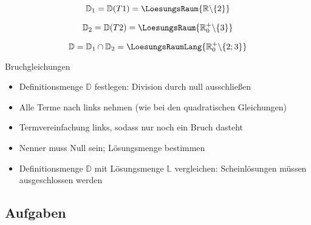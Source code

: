   $$\mathbb{D}_1=\mathbb{D}(T1)=\LoesungsRaum{\mathbb{R}\backslash\{2\}}$$

  $$\mathbb{D}_2=\mathbb{D}(T2)=\LoesungsRaum{\mathbb{R}^+_0\backslash\{3\}}$$

  $$\mathbb{D}=\mathbb{D}_1\cap\mathbb{D}_2=\LoesungsRaumLang{\mathbb{R}^{+}_{0}\backslash\{2;3\}}$$


  \newpage
  
\begin{rezept}{Bruchgleichungen}{}
  \begin{itemize}
    \item Definitionsmenge $\mathbb{D}$ festlegen: Division durch null ausschließen
  \item Alle Terme nach links nehmen (wie bei den quadratischen Gleichungen)
  \item Termvereinfachung links, sodass nur noch ein Bruch dasteht
  \item Nenner muss Null sein; Lösungsmenge bestimmen
   \item Definitionsmenge $\mathbb{D}$ mit Lösungsmenge $\mathbb{L}$
     vergleichen: Scheinlösungen müssen ausgeschlossen werden
  \end{itemize}
  
\end{rezept}

\subsection*{Aufgaben}





\newpage
